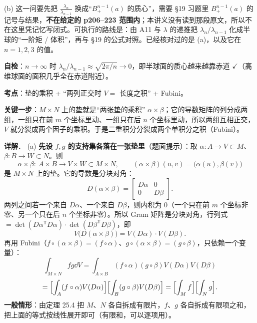 \documentclass[11pt]{ctexart}
\renewcommand{\qbreak}{\needspace{0.22\textheight}}
\newcommand{\Vvol}{V}
\begin{document}
(b) 这一问要先把 $\frac{\lambda_n}{\lambda_{n-1}}$ 换成“$B^{n-1}_+(a)$ 的质心”，需要 §19 习题里 $B^{n-1}_+(a)$ 的记号与结果，\textbf{不在给定的 p206--223 范围内}；本讲义没有读到那段原文，所以不在这里凭记忆写闭式。可执行的路线是：由 A11 与 $\lambda$ 的递推把 $\lambda_n/\lambda_{n-1}$ 化成半球的“一阶矩 / 体积”，再与 §19 的公式对照。已经核对过的是 (a)，以及它在 $n=1,2,3$ 的值。

\textbf{自检}：$n\to\infty$ 时 $\lambda_n/\lambda_{n-1}\approx\sqrt{2\pi/n}\to0$，即半球面的质心越来越靠赤道 $\checkmark$（高维球面的面积几乎全在赤道附近）。

\qbreak
{}\label{ax14}

\textbf{考点}：垫的乘积 + “两列正交时 $\Vvol=$ 长度之积” + Fubini。

\textbf{关键一步}：$M\times N$ 上的垫就是“两张垫的乘积” $\alpha\times\beta$；它的导数矩阵的列分成两组，一组只在前 $m$ 个坐标里动、一组只在后 $n$ 个坐标里动，所以两组互相正交，$\Vvol$ 就分裂成两个因子的乘积。于是二重积分分裂成两个单积分之积（Fubini）。

\textbf{详解}．
(a) \textbf{先设 $f,g$ 的支持集各落在一张垫里}（题面提示）：取 $\alpha:A\to V\subset M$、$\beta:B\to W\subset N$。则
\[ \alpha\times\beta:\ A\times B\longrightarrow V\times W\subset M\times N,\qquad (\alpha\times\beta)(u,v)=\bigl(\alpha(u),\beta(v)\bigr) \]
是 $M\times N$ 上的垫。它的导数是分块对角：
\[ D(\alpha\times\beta)=\begin{bmatrix}D\alpha&0\\0&D\beta\end{bmatrix}. \]
两列之间若一个来自 $D\alpha$、一个来自 $D\beta$，则内积为 $0$（一个只在前 $m$ 个坐标非零、另一个只在后 $n$ 个坐标非零）。所以 Gram 矩阵是分块对角，行列式 $=\det(D\alpha^{\mathsf T}D\alpha)\cdot\det(D\beta^{\mathsf T}D\beta)$，即
\[ \Vvol\bigl(D(\alpha\times\beta)\bigr)=\Vvol(D\alpha)\cdot\Vvol(D\beta). \]
再用 Fubini（$f\circ(\alpha\times\beta)=(f\circ\alpha)$、$g\circ(\alpha\times\beta)=(g\circ\beta)$，只依赖一个变量）：
\[ \int_{M\times N}fg\dd V=\int_{A\times B}(f\circ\alpha)(g\circ\beta)\Vvol(D\alpha)\Vvol(D\beta) \]
\[ =\Bigl[\int_A(f\circ\alpha)\Vvol(D\alpha)\Bigr]\Bigl[\int_B(g\circ\beta)\Vvol(D\beta)\Bigr]
=\Bigl[\int_Mf\Bigr]\Bigl[\int_Ng\Bigr]. \]
\textbf{一般情形}：由定理 25.4 把 $M$、$N$ 各自拆成有限片，$f$、$g$ 各自拆成有限项之和，把上面的等式按线性展开即可（有限和，可以逐项用）。
\end{document}
